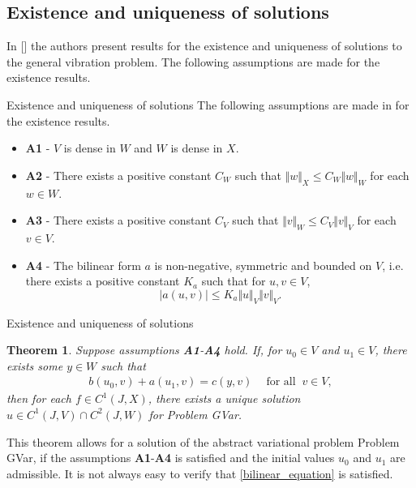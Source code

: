 \documentclass[8pt]{beamer}
\newcommand{\footfullcitenonumber}[1]{
  \footnotetext{\fullcite{#1}}
}
\begin{document}
    \subsection{Existence and uniqueness of solutions}

        In [\cite{VV02}] the authors present results for the existence and uniqueness of solutions to the general vibration problem. The following assumptions are made for the existence results.

        \begin{frame}{Existence and uniqueness of solutions}
            The following assumptions are made in \cite{VV02} for the existence results.
            \begin{itemize}
                \item[] \textbf{A1} - $V$ is dense in $W$ and $W$ is dense in $X$.

                \item[] \textbf{A2} - There exists a positive constant $C_{W}$ such that $\Vert w\Vert_{X} \leq C_{W}\Vert w\Vert_{W}$ for each $ w\in W$.

                \item[] \textbf{A3} - There exists a positive constant $C_{V}$ such that $\Vert v\Vert_{W} \leq C_{V}\Vert v\Vert_{V}$ for each $v \in V$.

                \item[] \textbf{A4} - The bilinear form $a$ is non-negative, symmetric and bounded on $V$, i.e. there exists a positive constant $K_a$ such that for $\displaystyle u,v \in V$, \[|a(u,v)| \leq K_a\Vert u \Vert_V \Vert v \Vert_V.\]
            \end{itemize}
            \footfullcitenonumber{VV02}
        \end{frame}

        \begin{frame}{Existence and uniqueness of solutions}
            \newtheorem{Thmx}{Theorem}
            \begin{Thmx}
                Suppose assumptions \textbf{A1}-\textbf{A4} hold. If, for $u_0 \in V$ and $u_1 \in V$, there exists some $y \in W$ such that
                \begin{eqnarray}
                    b(u_0,v) + a(u_1,v) = c(y,v) \ \ \ \ \textrm{ for all } \ v \in V, \label{bilinear_equation}
                \end{eqnarray}
                then for each $f \in C^1(J,X)$, there exists a unique solution $u \in C^1(J,V)\cap C^2(J,W)$ for Problem GVar.
            \end{Thmx}

            This theorem allows for a solution of the abstract variational problem Problem GVar, if the assumptions \textbf{A1}-\textbf{A4} is satisfied and the initial values $u_0$ and $u_1$ are admissible. It is not always easy to verify that \eqref{bilinear_equation} is satisfied.

            \footfullcitenonumber{VV02}
        \end{frame}
\end{document}
